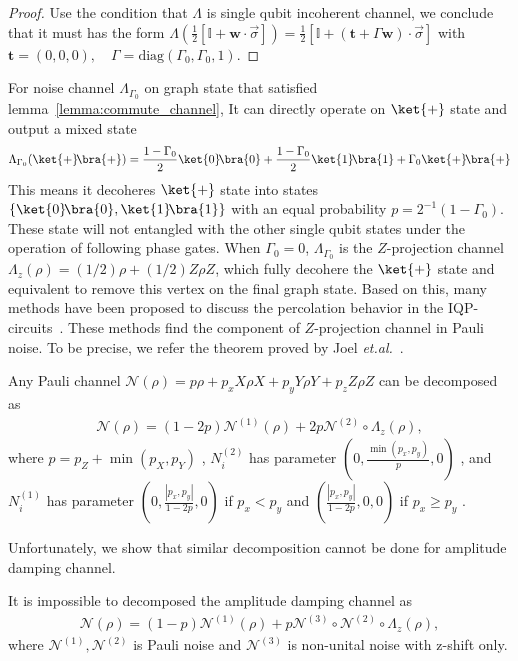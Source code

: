 \documentclass[aps]{revtex4-2}%
\begin{document}
\begin{proof}
    Use the condition that $\Lambda$ is single qubit incoherent channel, we conclude that it must has the form   \(\Lambda\left(\frac{1}{2}[\mathbb{I} + \mathbf{w} \cdot  \vec\sigma]\right) = \frac{1}{2}[\mathbb{I} + (\mathbf{t} + \Gamma\mathbf{w}) \cdot  \vec\sigma]\) with $\mathbf{t} = (0,0,0), \quad  \Gamma = \text{diag}(\Gamma_0,\Gamma_0,1)$.
\end{proof}
For noise channel $\Lambda_{\Gamma_0}$ on graph state that satisfied lemma~\ref{lemma:commute_channel}, It can directly operate on $\ket{+}$ state and output a mixed state
\begin{align}
    \Lambda_{\Gamma_0}(\ket{+}\!\bra{+}) = \frac{1 - \Gamma_0}{2} \ket{0}\!\bra{0} + \frac{1 - \Gamma_0}{2} \ket{1}\!\bra{1} + \Gamma_0 \ket{+}\!\bra{+}
\end{align}
This means it decoheres $\ket{+}$ state into states $\{\ket{0}\!\bra{0}, \ket{1}\!\bra{1}\}$  with an equal probability $p = {2^{-1}}{(1 - \Gamma_0)}$. These state will not entangled with the other single qubit states under the operation of following phase gates. When $\Gamma_0 = 0$, $\Lambda_{\Gamma_0}$ is the $Z$-projection channel $\Lambda_z(\rho) = ({1}/{2})\rho+({1}/{2})Z\rho Z$, which fully decohere the $\ket{+}$ state and equivalent to remove this vertex on the final graph state.
Based on this, many methods have been proposed to discuss the percolation behavior in the IQP-circuits~\cite{nelson2024polynomial,rajakumar2024polynomialtimeclassicalsimulationnoisy}. These methods find the component of $Z$-projection channel in Pauli noise. To be precise, we refer the theorem proved by Joel \emph{et.al.}~\cite{rajakumar2024polynomialtimeclassicalsimulationnoisy}. 
\begin{lemma} \label{lemma:z-projective_of_Paulinoise}
    Any Pauli channel $\mathcal{N}(\rho) = p \rho + p_x X \rho X + p_y Y \rho Y+ p_z Z \rho Z$ can be decomposed as
    \begin{align}
        \mathcal{N}(\rho) = (1 - 2p)\mathcal{N}^{(1)}(\rho) + 2p\mathcal{N}^{(2)} \circ \Lambda_z(\rho),
    \end{align}
    where $p = p_Z + \min(p_X,p_Y)$ , $N^{(2)}_i$ has parameter $(0,\frac{\min(p_x, p_y)}{p},0)$  , and  $N^{(1)}_i$ has parameter $(0,\frac{|p_x, p_y|}{1 - 2p},0)$ if $p_x < p_y$ and $(\frac{|p_x, p_y|}{1 - 2p},0,0)$ if $p_x \geq p_y$ .
\end{lemma}
Unfortunately, we show that similar decomposition cannot be done for amplitude damping channel.
\begin{lemma}\label{lemma: no_go_non-unital}
    It is impossible to decomposed the amplitude damping channel as
    \begin{align}
        \mathcal{N}(\rho) = (1 - p)\mathcal{N}^{(1)}(\rho) + p\mathcal{N}^{(3)} \circ \mathcal{N}^{(2)} \circ \Lambda_z(\rho),
    \end{align}
    where $\mathcal{N}^{(1)},\mathcal{N}^{(2)}$ is Pauli noise and  $\mathcal{N}^{(3)}$ is non-unital noise with z-shift only.
\end{lemma}
\end{document}
